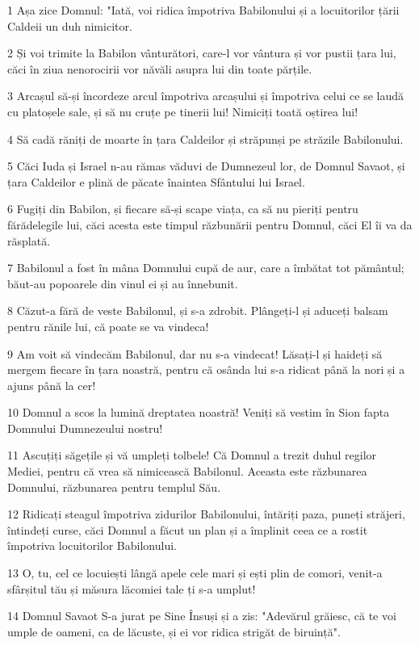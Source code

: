 \par 1 Așa zice Domnul: "Iată, voi ridica împotriva Babilonului și a locuitorilor țării Caldeii un duh nimicitor.
\par 2 Și voi trimite la Babilon vânturători, care-l vor vântura și vor pustii țara lui, căci în ziua nenorocirii vor năvăli asupra lui din toate părțile.
\par 3 Arcașul să-și încordeze arcul împotriva arcașului și împotriva celui ce se laudă cu platoșele sale, și să nu cruțe pe tinerii lui! Nimiciți toată oștirea lui!
\par 4 Să cadă răniți de moarte în țara Caldeilor și străpunși pe străzile Babilonului.
\par 5 Căci Iuda și Israel n-au rămas văduvi de Dumnezeul lor, de Domnul Savaot, și țara Caldeilor e plină de păcate înaintea Sfântului lui Israel.
\par 6 Fugiți din Babilon, și fiecare să-și scape viața, ca să nu pieriți pentru fărădelegile lui, căci acesta este timpul răzbunării pentru Domnul, căci El îi va da răsplată.
\par 7 Babilonul a fost în mâna Domnului cupă de aur, care a îmbătat tot pământul; băut-au popoarele din vinul ei și au înnebunit.
\par 8 Căzut-a fără de veste Babilonul, și s-a zdrobit. Plângeți-l și aduceți balsam pentru rănile lui, că poate se va vindeca!
\par 9 Am voit să vindecăm Babilonul, dar nu s-a vindecat! Lăsați-l și haideți să mergem fiecare în țara noastră, pentru că osânda lui s-a ridicat până la nori și a ajuns până la cer!
\par 10 Domnul a scos la lumină dreptatea noastră! Veniți să vestim în Sion fapta Domnului Dumnezeului nostru!
\par 11 Ascuțiți săgețile și vă umpleți tolbele! Că Domnul a trezit duhul regilor Mediei, pentru că vrea să nimicească Babilonul. Aceasta este răzbunarea Domnului, răzbunarea pentru templul Său.
\par 12 Ridicați steagul împotriva zidurilor Babilonului, întăriți paza, puneți străjeri, întindeți curse, căci Domnul a făcut un plan și a împlinit ceea ce a rostit împotriva locuitorilor Babilonului.
\par 13 O, tu, cel ce locuiești lângă apele cele mari și ești plin de comori, venit-a sfârșitul tău și măsura lăcomiei tale ți s-a umplut!
\par 14 Domnul Savaot S-a jurat pe Sine Însuși și a zis: "Adevărul grăiesc, că te voi umple de oameni, ca de lăcuste, și ei vor ridica strigăt de biruință".
